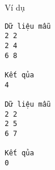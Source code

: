 Ví dụ  
\begin{verbatim}
Dữ liệu mẫu
2 2
2 4
6 8

Kết qủa
4

Dữ liệu mẫu
2 2
2 5
6 7

Kết qủa
0
\end{verbatim}